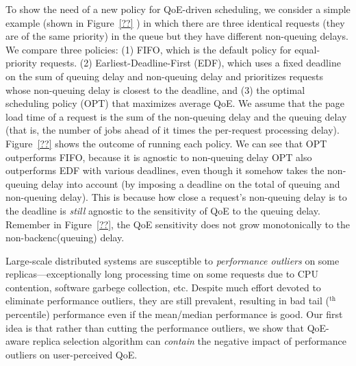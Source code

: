 To show the need of a new policy for QoE-driven  scheduling, we consider a simple example (shown in Figure~\ref{??} ) in which there are three identical requests (\ie they are of the same priority) in the queue but they have different non-queuing delays.
We compare three policies: 
(1) FIFO, which is the default policy for equal-priority requests.
(2) Earliest-Deadline-First (EDF), which uses a fixed deadline on the sum of queuing delay and non-queuing delay and prioritizes requests whose non-queuing delay is closest to the deadline, and 
(3) the optimal scheduling policy (OPT) that maximizes average QoE.
We assume that the page load time of a request is the sum of the non-queuing delay and the queuing delay (that is, the number of jobs ahead of it times the per-request processing delay).
Figure~\ref{??}  shows the outcome of running each policy. 
We can see that OPT outperforms FIFO, because it is agnostic to non-queuing delay
OPT also outperforms EDF with various deadlines, even though it somehow takes the non-queuing delay into account (by imposing a deadline on the total of queuing and non-queuing delay).
This is because how close a request's non-queuing delay is to the deadline is {\em still} agnostic to the sensitivity of QoE to the queuing delay. 
Remember in Figure~\ref{??}, the QoE sensitivity does not grow monotonically to the non-backenc(queuing) delay. 

Large-scale distributed systems are susceptible to {\em performance outliers} on some replicas---\eg exceptionally long processing time on some requests due to CPU contention, software garbege collection, etc. 
Despite much effort devoted to eliminate performance outliers, they are still prevalent, resulting in bad tail ($^\textrm{th}$ percentile) performance even if the mean/median performance is good.
Our first idea is that rather than cutting the performance outliers, we show that QoE-aware replica selection algorithm can {\em contain} the negative impact of performance outliers on user-perceived QoE.

